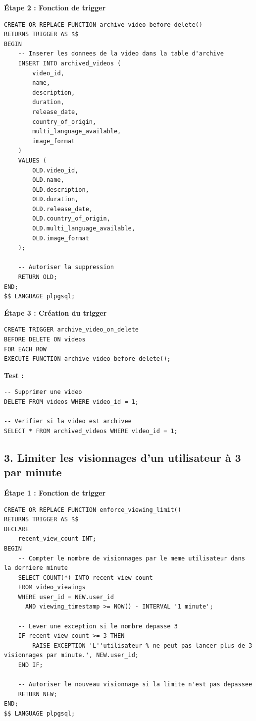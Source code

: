 \documentclass[a4paper, 12pt]{article}
\begin{document}
\textbf{Étape 2 : Fonction de trigger}

\begin{lstlisting}
CREATE OR REPLACE FUNCTION archive_video_before_delete()
RETURNS TRIGGER AS $$
BEGIN
    -- Inserer les donnees de la video dans la table d'archive
    INSERT INTO archived_videos (
        video_id, 
        name, 
        description, 
        duration, 
        release_date, 
        country_of_origin, 
        multi_language_available, 
        image_format
    )
    VALUES (
        OLD.video_id,
        OLD.name,
        OLD.description,
        OLD.duration,
        OLD.release_date,
        OLD.country_of_origin,
        OLD.multi_language_available,
        OLD.image_format
    );

    -- Autoriser la suppression
    RETURN OLD;
END;
$$ LANGUAGE plpgsql;
\end{lstlisting}

\textbf{Étape 3 : Création du trigger}

\begin{lstlisting}
CREATE TRIGGER archive_video_on_delete
BEFORE DELETE ON videos
FOR EACH ROW
EXECUTE FUNCTION archive_video_before_delete();
\end{lstlisting}

\textbf{Test :}

\begin{lstlisting}
-- Supprimer une video
DELETE FROM videos WHERE video_id = 1;

-- Verifier si la video est archivee
SELECT * FROM archived_videos WHERE video_id = 1;
\end{lstlisting}

\subsection*{3. Limiter les visionnages d'un utilisateur à 3 par minute}

\textbf{Étape 1 : Fonction de trigger}

\begin{lstlisting}
CREATE OR REPLACE FUNCTION enforce_viewing_limit()
RETURNS TRIGGER AS $$
DECLARE
    recent_view_count INT;
BEGIN
    -- Compter le nombre de visionnages par le meme utilisateur dans la derniere minute
    SELECT COUNT(*) INTO recent_view_count
    FROM video_viewings
    WHERE user_id = NEW.user_id
      AND viewing_timestamp >= NOW() - INTERVAL '1 minute';

    -- Lever une exception si le nombre depasse 3
    IF recent_view_count >= 3 THEN
        RAISE EXCEPTION 'L''utilisateur % ne peut pas lancer plus de 3 visionnages par minute.', NEW.user_id;
    END IF;

    -- Autoriser le nouveau visionnage si la limite n'est pas depassee
    RETURN NEW;
END;
$$ LANGUAGE plpgsql;
\end{lstlisting}
\end{document}
